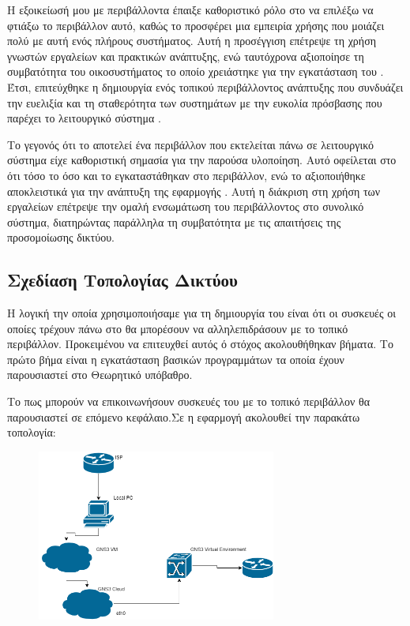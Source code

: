 Η εξοικείωσή μου με περιβάλλοντα  έπαιξε καθοριστικό ρόλο 
στο να επιλέξω να φτιάξω το περιβάλλον αυτό, καθώς το  προσφέρει μια 
εμπειρία χρήσης που μοιάζει πολύ με αυτή ενός πλήρους  
συστήματος. Αυτή η προσέγγιση επέτρεψε τη χρήση γνωστών εργαλείων και 
πρακτικών ανάπτυξης, ενώ ταυτόχρονα αξιοποίησε τη συμβατότητα του  
οικοσυστήματος το οποίο χρειάστηκε για την εγκατάσταση του . Έτσι, επιτεύχθηκε η δημιουργία ενός τοπικού περιβάλλοντος 
ανάπτυξης που συνδυάζει την ευελιξία και τη σταθερότητα των  
συστημάτων με την ευκολία πρόσβασης που παρέχει το λειτουργικό σύστημα .

Το γεγονός ότι το  αποτελεί ένα  περιβάλλον που εκτελείται πάνω σε λειτουργικό σύστημα  είχε καθοριστική σημασία για την παρούσα υλοποίηση. Αυτό οφείλεται στο ότι τόσο το  όσο και το  εγκαταστάθηκαν στο  περιβάλλον, ενώ το  αξιοποιήθηκε αποκλειστικά για την ανάπτυξη της εφαρμογής . Αυτή η διάκριση στη χρήση των εργαλείων επέτρεψε την ομαλή ενσωμάτωση του  περιβάλλοντος στο συνολικό σύστημα, διατηρώντας παράλληλα τη συμβατότητα με τις απαιτήσεις της προσομοίωσης δικτύου.

\subsection{Σχεδίαση Τοπολογίας Δικτύου}

Η λογική την οποία χρησιμοποιήσαμε για τη δημιουργία του  
είναι ότι οι συσκευές οι οποίες τρέχουν πάνω στο  θα μπορέσουν
να αλληλεπιδράσουν με το τοπικό  περιβάλλον. Προκειμένου να επιτευχθεί αυτός ό στόχος
ακολουθήθηκαν βήματα. Το πρώτο βήμα είναι η εγκατάσταση βασικών προγραμμάτων τα οποία έχουν παρουσιαστεί στο Θεωρητικό υπόβαθρο.

Το πως μπορούν να επικοινωνήσουν συσκευές του  με το τοπικό περιβάλλον θα παρουσιαστεί σε επόμενο κεφάλαιο.Σε  η εφαρμογή ακολουθεί την παρακάτω τοπολογία:

\FloatBarrier

\begin{figure}[htb]
	\centering
	\includegraphics[width=0.7\textwidth]{graphics/diagram.drawio.png}
	\caption{ }
\end{figure}


